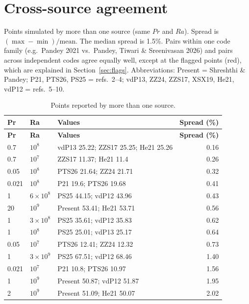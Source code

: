 \documentclass[11pt]{article}
\begin{document}
\section{Cross-source agreement}\label{sec:agreement}
Points simulated by more than one source (same $Pr$ and $Ra$). Spread is
$(\max-\min)/\mathrm{mean}$. The median spread is 1.5\%.
Pairs within one code family (e.g.\ Pandey 2021 vs.\ Pandey, Tiwari \&
Sreenivasan 2026) and pairs across independent codes agree equally well,
except at the flagged points (red), which are explained in
Section~\ref{sec:flags}. Abbreviations: Present = Shreshthi \& Pandey;
P21, PTS26, PS25 = refs.\ 2--4; vdP13, ZZ24, ZZS17, XSX19, He21, vdP12 =
refs.\ 5--10.

\begin{longtable}{l l p{9.5cm} r}
\caption{Points reported by more than one source.}\label{tab:agreement}\\
\toprule
\textbf{Pr} & \textbf{Ra} & \textbf{Values} & \textbf{Spread (\%)} \\
\midrule
\endfirsthead
\toprule
\textbf{Pr} & \textbf{Ra} & \textbf{Values} & \textbf{Spread (\%)} \\
\midrule
\endhead
\bottomrule
\endfoot
\rowcolor{included} 0.7 & $10^{8}$ & vdP13 25.22; ZZS17 25.25; He21 25.26 & 0.16 \\
\rowcolor{included} 0.7 & $10^{7}$ & ZZS17 11.37; He21 11.4 & 0.26 \\
\rowcolor{included} 0.05 & $10^{8}$ & PTS26 21.64; ZZ24 21.71 & 0.32 \\
\rowcolor{included} 0.021 & $10^{8}$ & P21 19.6; PTS26 19.68 & 0.41 \\
\rowcolor{included} 1 & $6\times10^{8}$ & PS25 44.15; vdP12 43.96 & 0.43 \\
\rowcolor{included} 20 & $10^{9}$ & Present 53.41; He21 53.71 & 0.56 \\
\rowcolor{included} 1 & $3\times10^{8}$ & PS25 35.61; vdP12 35.83 & 0.62 \\
\rowcolor{included} 1 & $10^{8}$ & PS25 25.01; vdP13 25.17 & 0.64 \\
\rowcolor{included} 0.05 & $10^{7}$ & PTS26 12.41; ZZ24 12.32 & 0.73 \\
\rowcolor{included} 1 & $3\times10^{9}$ & PS25 67.51; vdP12 68.46 & 1.40 \\
\rowcolor{included} 0.021 & $10^{7}$ & P21 10.8; PTS26 10.97 & 1.56 \\
\rowcolor{included} 1 & $10^{9}$ & Present 50.87; vdP12 51.87 & 1.95 \\
\rowcolor{included} 2 & $10^{9}$ & Present 51.09; He21 50.07 & 2.02 \\

\end{longtable}
\end{document}
